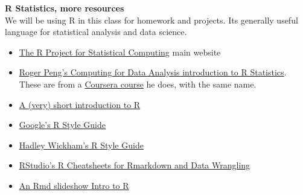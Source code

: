 \documentclass[11pt]{article} %
\begin{document}
{\bf R Statistics, more resources} \\
  We will be using R in this class for homework and projects.  
  Its generally useful language for statistical analysis and data science. 
\begin{itemize}
	\item \href{"http://www.r-project.org/index.html"}{The R Project for Statistical Computing}  \cite{r_r_2014} main website
	\item \href{"https://www.youtube.com/user/rdpeng/playlists"}{Roger Peng's Computing for Data Analysis introduction to R Statistics}. These are from a \href{"https://www.coursera.org/course/compdata"} {Coursera course} he does, with the same name. \cite{peng_computing_2014}\item \href{"http://cran.r-project.org/doc/contrib/Torfs+Brauer-Short-R-Intro.pdf"}{A (very) short introduction to R}  \cite{torfs_very_2014}
	\item \href{"https://google-styleguide.googlecode.com/svn/trunk/Rguide.xml"}{ Google's R Style Guide}
	\item \href{"http://stat405.had.co.nz/r-style.html"}{ Hadley Wickham's R Style Guide}  
	\item \href{"http://www.rstudio.com/resources/cheatsheets/"}{ RStudio's R Cheatsheets for Rmarkdown and Data Wrangling}
	\item \href{"http://www.theresearchkitchen.com/blog"}{An Rmd slideshow Intro to R}
\end{itemize}
\end{document}
